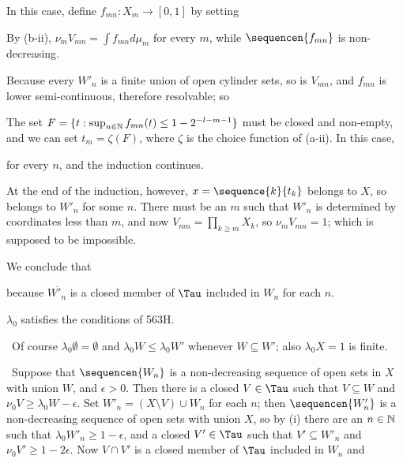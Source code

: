 {

\noindent In this case, define $f_{mn}:X_m\to[0,1]$ by setting


\noindent By (b-ii),
$\nu_mV_{mn}=\int f_{mn}d\mu_m$ for every $m$, while $\sequencen{f_{mn}}$
is non-decreasing.

Because every $W'_n$ is a finite union of open cylinder sets, so
is $V_{mn}$, and $f_{mn}$ is lower semi-continuous, therefore resolvable;
so


\noindent The set
$F=\{t:\sup_{n\in\Bbb N}f_{mn}(t)\le 1-2^{-l-m-1}\}$ must be closed and
non-empty, and we can
set $t_m=\zeta(F)$, where $\zeta$ is the choice function of (a-ii).
In this case,


\noindent for every $n$, and the induction continues.

At the end of the induction, however, $x=\sequence{k}{t_k}$ belongs to $X$,
so belongs to $W'_n$ for some $n$.   There must be an $m$ such that $W'_n$
is determined by coordinates less than $m$, and now
$V_{mn}=\prod_{k\ge m}X_k$, so $\nu_mV_{mn}=1$;  which is supposed to be
impossible.\ \Bang

We conclude that


\noindent because $\overline{W'_n}$ is a closed member of $\Tau$ included
in $W_n$ for each $n$.\ \Qed

\medskip

 $\lambda_0$ satisfies the conditions of 563H.   \Prf\

\medskip

\qquad\grheada\ Of course $\lambda_0\emptyset=\emptyset$ and
$\lambda_0W\le\lambda_0W'$ whenever $W\subseteq W'$;  also $\lambda_0X=1$
is finite.

\medskip

\qquad\grheadb\ Suppose that $\sequencen{W_n}$ is a non-decreasing sequence
of open sets in $X$ with union $W$, and $\epsilon>0$.   Then
there is a closed
$V\in\Tau$ such that $V\subseteq W$ and $\nu_0V\ge\lambda_0W-\epsilon$.
Set $W'_n=(X\setminus V)\cup W_n$ for each $n$;  then $\sequencen{W'_n}$
is a non-decreasing sequence of open sets with union $X$, so by (i)
there are an
$n\in\Bbb N$ such that $\lambda_0W'_n\ge 1-\epsilon$, and a closed
$V'\in\Tau$ such that $V'\subseteq W'_n$ and $\nu_0V'\ge 1-2\epsilon$.
Now $V\cap V'$ is a closed member of $\Tau$ included in $W_n$ and

}
